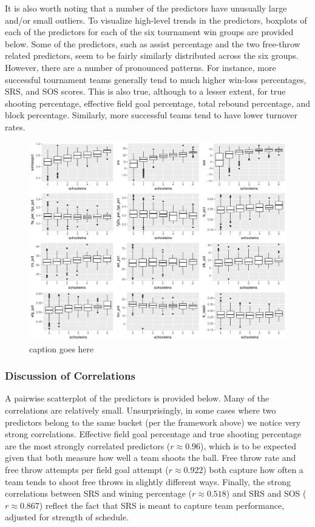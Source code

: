 \documentclass[10pt,a4paper, hidelinks]{article} %
\begin{document}
It is also worth noting that a number of the predictors have unusually large and/or small outliers. To visualize high-level trends in the predictors, boxplots of each of the predictors for each of the six tournament win groups are provided below. Some of the predictors, such as assist percentage and the two free-throw related predictors, seem to be fairly similarly distributed across the six groups. However, there are a number of pronounced patterns. For instance, more successful tournament teams generally tend to much higher win-loss percentages, SRS, and SOS scores. This is also true, although to a lesser extent, for true shooting percentage, effective field goal percentage, total rebound percentage, and block percentage. Similarly, more successful teams tend to have lower turnover rates. 

\begin{figure}[H]
	\centering
	\includegraphics[width=1\linewidth]{../fig/RayleighsWetDream.pdf}
	\caption{caption goes here}
	\label{fig:rayleighwetdream}
\end{figure}

\subsubsection{Discussion of Correlations}

A pairwise scatterplot of the predictors is provided below. Many of the correlations are relatively small. Unsurprisingly, in some cases where two predictors belong to the same bucket (per the framework above) we notice very strong correlations. Effective field goal percentage and true shooting percentage are the most strongly correlated predictors ($r \approx 0.96$), which is to be expected given that both measure how well a team shoots the ball. Free throw rate and free throw attempts per field goal attempt ($r \approx 0.922$) both capture how often a team tends to shoot free throws in slightly different ways. Finally, the strong correlations between SRS and wining percentage ($r \approx 0.518$) and SRS and SOS ($r \approx 0.867$) reflect the fact that SRS is meant to capture team performance, adjusted for strength of schedule.
\end{document}
